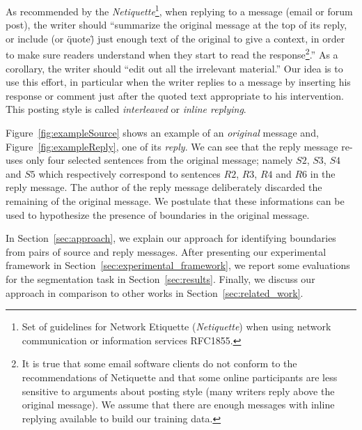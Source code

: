 As recommended by the \textit{Netiquette}\footnote{Set of guidelines for Network Etiquette (\textit{Netiquette}) when using network communication or information services RFC1855.}, when replying to a message (email or forum post), the writer should ``summarize the original message at the top of its reply, or include (or \"quote\") just enough text of the original to give a context, in order to make sure readers understand when they start to read the response\footnote{It is true that some email software clients do not conform to the recommendations of Netiquette and that some online participants are less sensitive to arguments about posting style (many writers reply above  the original message). We assume that there are enough messages with inline replying available to build our training data.}.''  As a corollary, the writer should ``edit out all the irrelevant material.''
%
Our idea is to use this effort, in particular when the writer replies to a message by inserting his response or comment just after the quoted text appropriate to his intervention. 
%
This posting style is called \textit{interleaved} or \textit{inline replying}.
%

Figure~\ref{fig:exampleSource} shows an example of an \textit{original} message and, Figure~\ref{fig:exampleReply}, one of its \textit{reply}.
%
We can see that the reply message re-uses only four selected sentences from the original message; namely $S2$, $S3$, $S4$ and $S5$ which respectively correspond to sentences  $R2$, $R3$, $R4$ and $R6$ in the reply message.
%
The author of the reply message deliberately discarded the remaining of the original message.
%
We postulate that these informations can be used to hypothesize the presence of boundaries in the original message. 

In Section~\ref{sec:approach}, we explain our approach for identifying boundaries from pairs of source and reply messages.
%
After presenting our experimental framework in Section~\ref{sec:experimental_framework}, we report some evaluations for the segmentation task in Section~\ref{sec:results}.
%
Finally, we discuss our approach in comparison to other works in Section~\ref{sec:related_work}.